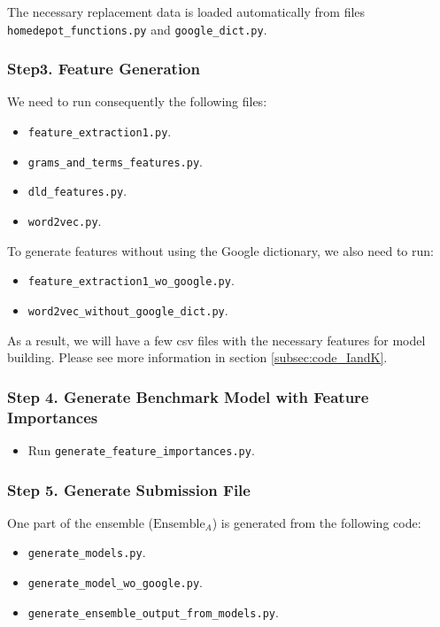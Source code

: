 \documentclass[12pt]{article}
\begin{document}
\begin{appendices}
The necessary replacement data is loaded automatically from files  \texttt{homedepot\_functions.py} and \texttt{google\_dict.py}.
\subsubsection{Step3. Feature Generation}
\label{subsubsec:README_Igor_Kostia}

We need to run consequently the following files:
\begin{itemize}
\item \texttt{feature\_extraction1.py}.
\item \texttt{grams\_and\_terms\_features.py}.
\item  \texttt{dld\_features.py}.
\item \texttt{word2vec.py}.
\end{itemize}

To generate features without using the Google dictionary, we also need to run:
\begin{itemize}
\item \texttt{feature\_extraction1\_wo\_google.py}.
\item \texttt{word2vec\_without\_google\_dict.py}.
\end{itemize}

As a result, we will have a few csv files with the necessary features for model building. Please see more information in section \ref{subsec:code_IandK}.

\subsubsection{Step 4. Generate Benchmark Model with Feature Importances}
\begin{itemize}
\item Run \texttt{generate\_feature\_importances.py}.
\end{itemize}

\subsubsection{Step 5. Generate Submission File}
\label{subsubsec:generate_submission_IandK}
One part of the ensemble ($\text{Ensemble}_A$) is generated from the following code:
\begin{itemize}
\item \texttt{generate\_models.py}.
\item \texttt{generate\_model\_wo\_google.py}.
\item \texttt{generate\_ensemble\_output\_from\_models.py}.
\end{itemize}


\end{appendices}
\end{document}
